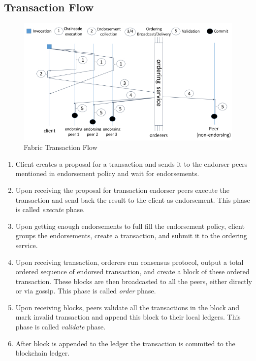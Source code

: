 \subsection{Transaction Flow}
\begin{figure}[!h]
    \centering
    \includegraphics[scale=0.6]{images/fabrictxn.jpeg}
    \caption{Fabric Transaction Flow \cite{androulaki2018hyperledger}}
    \label{fig:fabrictxn}
\end{figure}
\begin{enumerate}
    \item Client creates a proposal for a transaction and sends it to the endorser peers mentioned in endorsement policy and wait for endorsements.
    \item Upon receiving the proposal for transaction endorser peers execute the transaction and send back the result to the client as endorsement. This phase is called \textit{execute} phase.
    \item Upon getting enough endorsements to full fill the endorsement policy, client groups the endorsements, create a transaction, and submit it to the ordering service.
    \item Upon receiving transaction, orderers run consensus protocol, output a total ordered sequence of endorsed transaction, and create a block of these ordered transaction. These blocks are then broadcasted to all the peers, either directly or via gossip. This phase is called \textit{order} phase.
    \item Upon receiving blocks, peers validate all the transactions in the block and mark invalid transaction and append this block to their local ledgers. This phase is called \textit{validate} phase.
    \item After block is appended to the ledger the transaction is commited to the blockchain ledger.
\end{enumerate}

